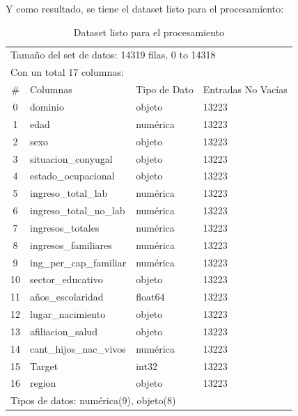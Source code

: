 \documentclass[a4paper]{article}
\begin{document}
 \vspace{1cm}
 
Y como resultado, se tiene el dataset listo para el procesamiento:

        \begin{table}[H]
            \centering
            \begin{tabular}{clll}
                \multicolumn{4}{l}{Tamaño del set de datos: 14319 filas, 0 to 14318} \\
                \multicolumn{4}{l}{Con un total 17 columnas:} \\
                \toprule
                \#  & Columnas & Tipo de Dato & Entradas No Vacías \\ \hline
                0 & dominio & objeto & 13223 \\ 
                1 & edad & numérica & 13223 \\ 
                2 & sexo & objeto & 13223 \\ 
                3 & situacion\_conyugal & objeto & 13223 \\ 
                4 & estado\_ocupacional & objeto & 13223 \\ 
                5 & ingreso\_total\_lab & numérica & 13223 \\ 
                6 & ingreso\_total\_no\_lab & numérica & 13223 \\ 
                7 & ingresos\_totales & numérica & 13223 \\ 
                8 & ingresos\_familiares & numérica & 13223 \\ 
                9 & ing\_per\_cap\_familiar & numérica & 13223 \\ 
                10 & sector\_educativo & objeto & 13223 \\ 
                11 & años\_escolaridad & float64 & 13223 \\ 
                12 & lugar\_nacimiento & objeto & 13223 \\ 
                13 & afiliacion\_salud & objeto & 13223 \\ 
                14 & cant\_hijos\_nac\_vivos & numérica & 13223 \\ 
                15 & Target & int32 & 13223 \\ 
                16 & region & objeto & 13223 \\ 
                \bottomrule
                \multicolumn{4}{l}{Tipos de datos: numérica(9), objeto(8)} \\
            \end{tabular}
            \caption{Dataset listo para el procesamiento}
            \label{Final Dataset}
        \end{table}
\end{document}
